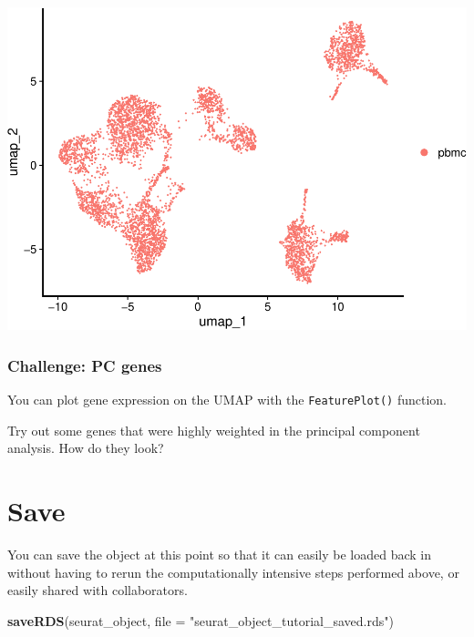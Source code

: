 \documentclass[
]{book}
\newenvironment{Shaded}{\begin{snugshade}}{\end{snugshade}}
\newcommand{\AttributeTok}[1]{\textcolor[rgb]{0.13,0.29,0.53}{#1}}
\newcommand{\FunctionTok}[1]{\textcolor[rgb]{0.13,0.29,0.53}{\textbf{#1}}}
\newcommand{\NormalTok}[1]{#1}
\newcommand{\StringTok}[1]{\textcolor[rgb]{0.31,0.60,0.02}{#1}}
\begin{document}
\includegraphics{scRNAseqInR_ABACBS_2024_Doco_files/figure-latex/Umapplot-1.pdf}

\hypertarget{challenge-pc-genes}{%
\subsubsection*{Challenge: PC genes}\label{challenge-pc-genes}}

You can plot gene expression on the UMAP with the \texttt{FeaturePlot()} function.

Try out some genes that were highly weighted in the principal component analysis. How do they look?

\hypertarget{section-7}{%
\subsubsection*{}\label{section-7}}

\hypertarget{save}{%
\section{Save}\label{save}}

You can save the object at this point so that it can easily be loaded back in without having to rerun the computationally intensive steps performed above, or easily shared with collaborators.

\begin{Shaded}
\begin{Highlighting}[]
\FunctionTok{saveRDS}\NormalTok{(seurat\_object, }\AttributeTok{file =} \StringTok{"seurat\_object\_tutorial\_saved.rds"}\NormalTok{) }
\end{Highlighting}
\end{Shaded}
\end{document}
